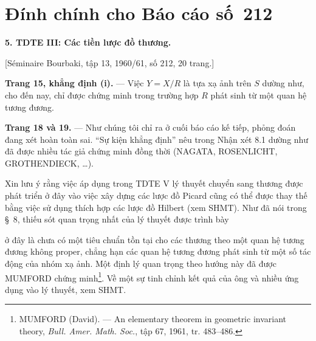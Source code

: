 \clearpage
\chapter*{Đính chính cho Báo cáo số~212}
\setcounter{footnote}{2}

\noindent\textbf{5. TDTE III: Các tiền lược đồ thương.}

\begin{center}
[Séminaire Bourbaki, tập 13, 1960/61, số 212, 20 trang.]
\end{center}

\noindent\textbf{Trang 15, khẳng định (i).} --- Việc $Y=X/R$ là tựa xạ ảnh
trên $S$ dường như, cho đến nay, chỉ được chứng minh trong trường hợp $R$
phát sinh từ một quan hệ tương đương.

\noindent\textbf{Trang 18 và 19.} --- Như chúng tôi chỉ ra ở cuối báo cáo kế
tiếp, phỏng đoán đang xét hoàn toàn sai. ``Sự kiện khẳng định'' nêu trong Nhận
xét 8.1 dường như đã được nhiều tác giả chứng minh đồng thời (NAGATA,
ROSENLICHT, GROTHENDIECK, \ldots).

Xin lưu ý rằng việc áp dụng trong TDTE V lý thuyết chuyển sang thương được
phát triển ở đây vào việc xây dựng các lược đồ Picard cũng có thể được thay
thế bằng việc sử dụng thích hợp các lược đồ Hilbert (xem SHMT). Như đã nói
trong §~8, thiếu sót quan trọng nhất của lý thuyết được trình bày

ở đây là chưa có một tiêu chuẩn tồn tại cho các thương theo một quan hệ tương
đương không proper, chẳng hạn các quan hệ tương đương phát sinh từ một số tác
động của nhóm xạ ảnh. Một định lý quan trọng theo hướng này đã được MUMFORD
chứng minh\footnote{MUMFORD (David). --- An elementary theorem in geometric
invariant theory, \emph{Bull. Amer. Math. Soc.}, tập 67, 1961, tr. 483--486.}.
Về một sự tinh chỉnh kết quả của ông và nhiều ứng dụng vào lý thuyết, xem
SHMT.

\par

